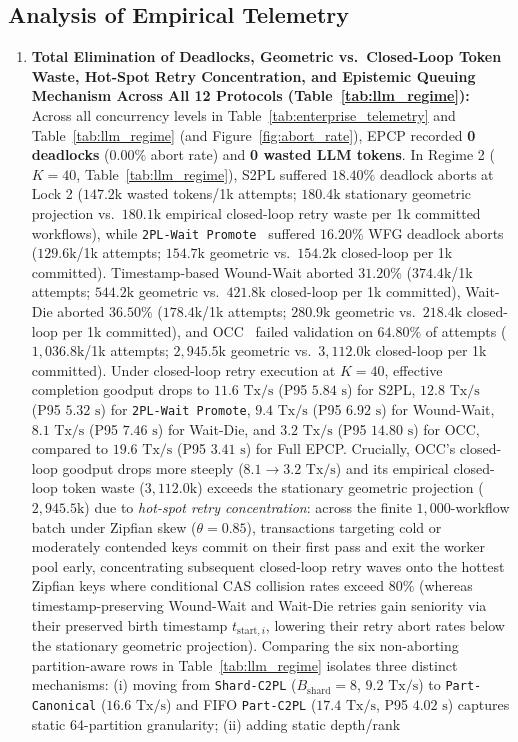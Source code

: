 \documentclass[conference,10pt]{IEEEtran}
\begin{document}
\subsection{Analysis of Empirical Telemetry}
\begin{enumerate}
    \item \textbf{Total Elimination of Deadlocks, Geometric vs.\ Closed-Loop Token Waste, Hot-Spot Retry Concentration, and Epistemic Queuing Mechanism Across All 12 Protocols (Table~\ref{tab:llm_regime}):} Across all concurrency levels in Table~\ref{tab:enterprise_telemetry} and Table~\ref{tab:llm_regime} (and Figure~\ref{fig:abort_rate}), EPCP recorded \textbf{0 deadlocks} ($0.00\%$ abort rate) and \textbf{0 wasted LLM tokens}. In Regime 2 ($K=40$, Table~\ref{tab:llm_regime}), S2PL suffered $18.40\%$ deadlock aborts at Lock 2 ($147.2\text{k}$ wasted tokens/1k attempts; $180.4\text{k}$ stationary geometric projection vs.\ $180.1\text{k}$ empirical closed-loop retry waste per 1k committed workflows), while \texttt{2PL-Wait Promote}~\cite{abbott1992scheduling} suffered $16.20\%$ WFG deadlock aborts ($129.6\text{k}$/1k attempts; $154.7\text{k}$ geometric vs.\ $154.2\text{k}$ closed-loop per 1k committed). Timestamp-based Wound-Wait aborted $31.20\%$ ($374.4\text{k}$/1k attempts; $544.2\text{k}$ geometric vs.\ $421.8\text{k}$ closed-loop per 1k committed), Wait-Die aborted $36.50\%$ ($178.4\text{k}$/1k attempts; $280.9\text{k}$ geometric vs.\ $218.4\text{k}$ closed-loop per 1k committed), and OCC~\cite{kung1981optimistic} failed validation on $64.80\%$ of attempts ($1{,}036.8\text{k}$/1k attempts; $2{,}945.5\text{k}$ geometric vs.\ $3{,}112.0\text{k}$ closed-loop per 1k committed). Under closed-loop retry execution at $K=40$, effective completion goodput drops to $11.6\text{ Tx/s}$ (P95 $5.84\text{ s}$) for S2PL, $12.8\text{ Tx/s}$ (P95 $5.32\text{ s}$) for \texttt{2PL-Wait Promote}, $9.4\text{ Tx/s}$ (P95 $6.92\text{ s}$) for Wound-Wait, $8.1\text{ Tx/s}$ (P95 $7.46\text{ s}$) for Wait-Die, and $3.2\text{ Tx/s}$ (P95 $14.80\text{ s}$) for OCC, compared to $19.6\text{ Tx/s}$ (P95 $3.41\text{ s}$) for Full EPCP. Crucially, OCC's closed-loop goodput drops more steeply ($8.1 \to 3.2\text{ Tx/s}$) and its empirical closed-loop token waste ($3{,}112.0\text{k}$) exceeds the stationary geometric projection ($2{,}945.5\text{k}$) due to \textit{hot-spot retry concentration}: across the finite $1{,}000$-workflow batch under Zipfian skew ($\theta=0.85$), transactions targeting cold or moderately contended keys commit on their first pass and exit the worker pool early, concentrating subsequent closed-loop retry waves onto the hottest Zipfian keys where conditional CAS collision rates exceed $80\%$ (whereas timestamp-preserving Wound-Wait and Wait-Die retries gain seniority via their preserved birth timestamp $t_{\text{start},i}$, lowering their retry abort rates below the stationary geometric projection). Comparing the six non-aborting partition-aware rows in Table~\ref{tab:llm_regime} isolates three distinct mechanisms: (i) moving from \texttt{Shard-C2PL} ($B_{\text{shard}}=8$, $9.2\text{ Tx/s}$) to \texttt{Part-Canonical} ($16.6\text{ Tx/s}$) and FIFO \texttt{Part-C2PL} ($17.4\text{ Tx/s}$, P95 $4.02\text{ s}$) captures static 64-partition granularity; (ii) adding static depth/rank 
\end{enumerate}
\end{document}
